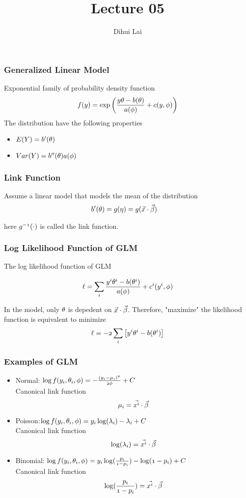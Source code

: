 \documentclass[notheorems, aspectratio=54]{beamer}
\title{Lecture 05}
\author{Dihui Lai}
\institute[WUSTL]{dlai@wustl.edu}
\begin{document}
\begin{frame}
    \titlepage
\end{frame}

\begin{frame}
\frametitle{Generalized Linear Model}
Exponential family of probability density function
$$
\mathnormal{f(y)}=\exp\mathnormal{\left( \frac{y\theta-b(\theta)}{a(\phi)}+c(y, \phi)\right)}
$$
The distribution have the following properties
\begin{itemize}
\item $\mathnormal{E(Y)}=\mathnormal{b'(\theta)}$
\item $\mathnormal{Var(Y)}=\mathnormal{b''(\theta)a(\phi)}$
\end{itemize}
\end{frame}

\begin{frame}
\frametitle{Link Function}
Assume a linear model that models the mean of the distribution 
\begin{align*}
\mathnormal{b'(\theta)}&=\mathnormal{g(\eta)}=\mathnormal{g(\vec{x}\cdot\vec{\beta})}
\end{align*}

here $\mathnormal{g^{-1}(\cdot)}$ is called the link function.

\end{frame}

\begin{frame}
\frametitle{Log Likelihood Function of GLM}
The log likelihood function of GLM

$$\mathnormal{\ell}=\mathnormal{\sum_{i}\frac{y^i\theta^i-b(\theta^i)}{a(\phi)}+c^i(y^i, \phi)}$$

In the model, only $\mathnormal{\theta}$ is depedent on $\mathnormal{\vec{x}\cdot\vec{\beta}}$. Therefore, "maximize" the likelihood function is equivalent to minimize  
$$\mathnormal{\ell=-2\sum_{i} \left[y^i\theta^i-b(\theta^i)\right]}$$

\end{frame}


\begin{frame}
\frametitle{Examples of GLM}

\begin{itemize}
\item Normal: $\mathnormal{\log f(y_i, \theta_i, \phi)=-\frac{(y_i-\mu_i)^2}{2\phi}+C}$\\
Canonical link function $$\mathnormal{\mu_i=\vec{x^i}\cdot\vec{\beta}}$$

\item Poisson:$\mathnormal{\log f(y_i, \theta_i, \phi)=y_i \log(\lambda_i)-\lambda_i+C}$\\
Canonical link function $$\mathnormal{\log(\lambda_i)=\vec{x^i}\cdot\vec{\beta}}$$
 
\item Binomial: $\mathnormal{\log f(y_i, \theta_i, \phi)=y_i \log(\frac{p_i}{1-p_i})-\log(1-p_i)+C}$\\
Canonical link function $$\mathnormal{\log(\frac{p_i}{1-p_i})=\vec{x^i}\cdot\vec{\beta}}$$

\end{itemize}

\end{frame}
\end{document}
